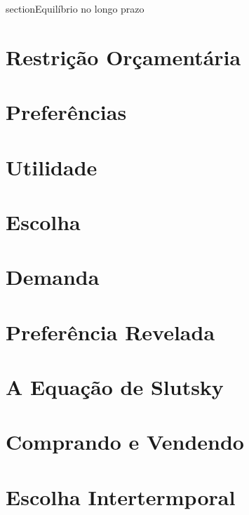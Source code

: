 \documentclass[a4paper,11pt,oneside]{book}
\theoremstyle{definition}
\theoremstyle{break}
\begin{document}
section{Equilíbrio no longo prazo}

\chapter{Restrição Orçamentária}

\chapter{Preferências}

\chapter{Utilidade}

\chapter{Escolha}

\chapter{Demanda}

\chapter{Preferência Revelada}

\chapter{A Equação de Slutsky}

\chapter{Comprando e Vendendo}

\chapter{Escolha Intertermporal}
\end{document}
